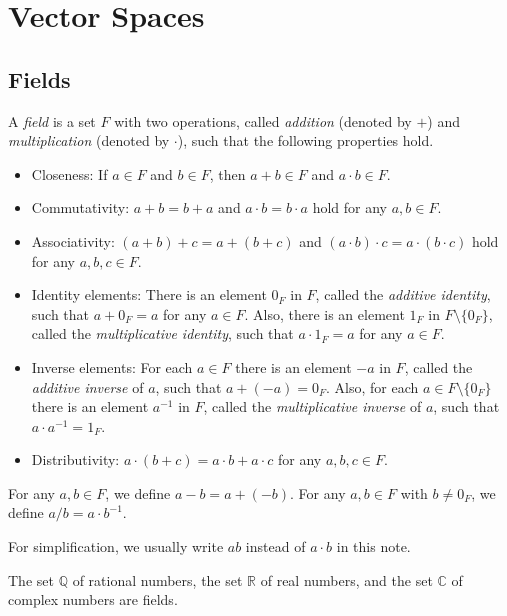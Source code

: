 \chapter{Vector Spaces}
\section{Fields}
\begin{definition}
  \label{def:field}
  A \emph{field} is a set $F$ with two operations, called \emph{addition}
  (denoted by $+$) and \emph{multiplication} (denoted by $\cdot$), such that
  the following properties hold.
  \begin{itemize}
    \item Closeness: If $a \in F$ and $b \in F$, then $a + b \in F$ and
    $a \cdot b \in F$.
    \item Commutativity: $a + b = b + a$ and $a \cdot b = b \cdot a$ hold for
    any $a, b \in F$.
    \item Associativity: $(a + b) + c = a + (b + c)$ and
    $(a \cdot b) \cdot c = a \cdot (b \cdot c)$ hold for any $a, b, c \in F$.
    \item Identity elements: There is an element $0_F$ in $F$, called the
    \emph{additive identity}, such that $a + 0_F = a$ for any $a \in F$.
    Also, there is an element $1_F$ in $F \setminus \{0_F\}$, called the
    \emph{multiplicative identity}, such that $a \cdot 1_F = a$ for any
    $a \in F$.
    \item Inverse elements: For each $a \in F$ there is an element $-a$ in $F$,
    called the \emph{additive inverse} of $a$, such that $a + (-a) = 0_F$.
    Also, for each $a \in F \setminus \{0_F\}$ there is an element $a^{-1}$ in
    $F$, called the \emph{multiplicative inverse} of $a$, such that
    $a \cdot a^{-1} = 1_F$.
    \item Distributivity: $a \cdot (b + c) = a \cdot b + a \cdot c$ for any
    $a, b, c \in F$.
  \end{itemize}
  For any $a, b \in F$, we define $a - b = a + (-b)$.
  For any $a, b \in F$ with $b \neq 0_F$, we define $a / b = a \cdot b^{-1}$.
\end{definition}
\begin{remark}
  For simplification, we usually write $ab$ instead of $a \cdot b$ in this
  note.
\end{remark}

\begin{examples}
  The set $\mathbb{Q}$ of rational numbers, the set $\mathbb{R}$ of real
  numbers, and the set $\mathbb{C}$ of complex numbers are fields.
\end{examples}


